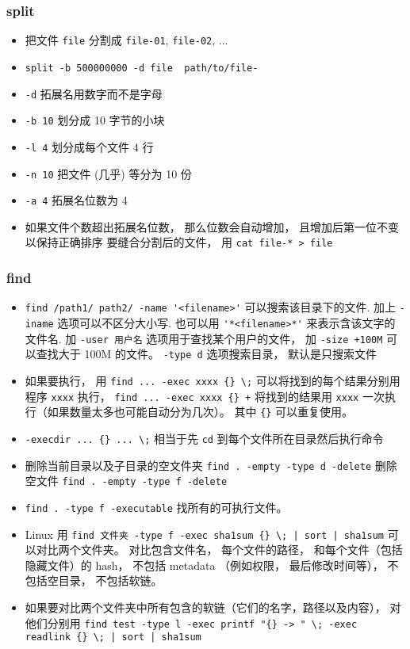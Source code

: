\subsubsection{split}
\begin{itemize}
\item 把文件 \verb`file` 分割成 \verb`file-01`, \verb`file-02`, ...
\item \verb`split -b 500000000 -d file  path/to/file-`
\item \verb`-d` 拓展名用数字而不是字母
\item \verb`-b 10` 划分成 10 字节的小块
\item \verb`-l 4` 划分成每个文件 4 行
\item \verb`-n 10` 把文件 (几乎) 等分为 10 份
\item \verb`-a 4` 拓展名位数为 4
\item 如果文件个数超出拓展名位数， 那么位数会自动增加， 且增加后第一位不变以保持正确排序
要缝合分割后的文件， 用 \verb`cat file-* > file`
\end{itemize}


\subsubsection{find}
\begin{itemize}
\item \verb`find /path1/ path2/ -name '<filename>'` 可以搜索该目录下的文件. 加上 \verb`-iname` 选项可以不区分大小写. 也可以用 \verb`'*<filename>*'` 来表示含该文字的文件名. 加 \verb`-user 用户名` 选项用于查找某个用户的文件， 加 \verb`-size +100M` 可以查找大于 100M 的文件。 \verb`-type d` 选项搜索目录， 默认是只搜索文件
\item 如果要执行， 用 \verb`find ... -exec xxxx {} \;` 可以将找到的每个结果分别用程序 \verb`xxxx` 执行， \verb`find ... -exec xxxx {} +` 将找到的结果用 \verb`xxxx` 一次执行（如果数量太多也可能自动分为几次）。 其中 \verb`{}` 可以重复使用。
\item \verb`-execdir ... {} ... \;` 相当于先 \verb`cd` 到每个文件所在目录然后执行命令
\item 删除当前目录以及子目录的空文件夹 \verb`find . -empty -type d -delete` 删除空文件 \verb`find . -empty -type f -delete`
\item \verb|find . -type f -executable| 找所有的可执行文件。
\item Linux 用 \verb`find 文件夹 -type f -exec sha1sum {} \; | sort | sha1sum` 可以对比两个文件夹。 对比包含文件名， 每个文件的路径， 和每个文件（包括隐藏文件）的 hash， 不包括 metadata （例如权限， 最后修改时间等）， 不包括空目录， 不包括软链。
\item 如果要对比两个文件夹中所有包含的软链（它们的名字，路径以及内容）， 对他们分别用 \verb`find test -type l -exec printf "{} -> " \; -exec readlink {} \; | sort | sha1sum`
\end{itemize}

